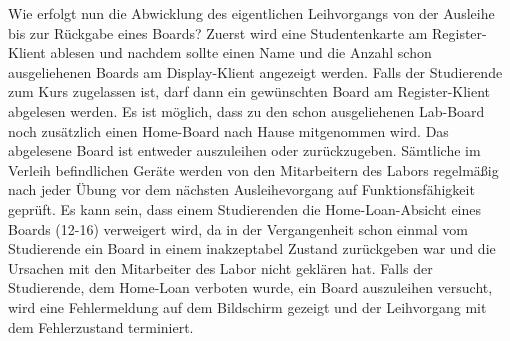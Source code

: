 Wie erfolgt nun die Abwicklung des eigentlichen Leihvorgangs von der Ausleihe bis zur Rückgabe eines Boards?  Zuerst wird eine Studentenkarte am Register-Klient ablesen und nachdem sollte einen Name und die Anzahl schon ausgeliehenen Boards am Display-Klient angezeigt werden. Falls der Studierende zum Kurs zugelassen ist, darf dann ein gewünschten Board am Register-Klient abgelesen werden. Es ist möglich, dass zu den schon ausgeliehenen Lab-Board noch zusätzlich einen Home-Board nach Hause mitgenommen wird. Das abgelesene Board ist entweder auszuleihen oder zurückzugeben. Sämtliche im Verleih befindlichen Geräte werden von den Mitarbeitern des Labors regelmäßig nach jeder Übung vor dem nächsten Ausleihevorgang auf Funktionsfähigkeit geprüft. Es kann sein, dass einem Studierenden die Home-Loan-Absicht eines Boards (12-16) verweigert wird, da in der Vergangenheit schon einmal vom Studierende ein Board in einem inakzeptabel Zustand zurückgeben war und die Ursachen mit den Mitarbeiter des Labor nicht geklären hat. Falls der Studierende, dem Home-Loan verboten wurde, ein Board auszuleihen versucht, wird eine Fehlermeldung auf dem Bildschirm gezeigt und der Leihvorgang mit dem Fehlerzustand terminiert.  


